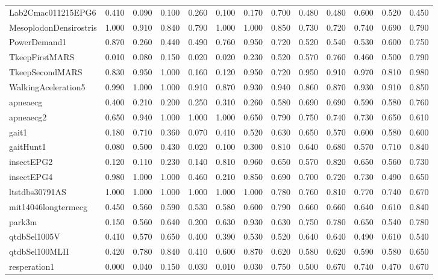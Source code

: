 \begin{tabular}{lrrrrrrrrrrrr}
Lab2Cmac011215EPG6 & 0.410 & 0.090 & 0.100 & 0.260 & 0.100 & 0.170 & 0.700 & 0.480 & 0.480 & 0.600 & 0.520 & 0.450 \\
MesoplodonDensirostris & 1.000 & 0.910 & 0.840 & 0.790 & 1.000 & 1.000 & 0.850 & 0.730 & 0.720 & 0.740 & 0.690 & 0.790 \\
PowerDemand1 & 0.870 & 0.260 & 0.440 & 0.490 & 0.760 & 0.950 & 0.720 & 0.520 & 0.540 & 0.530 & 0.600 & 0.750 \\
TkeepFirstMARS & 0.010 & 0.080 & 0.150 & 0.020 & 0.020 & 0.230 & 0.520 & 0.570 & 0.760 & 0.460 & 0.500 & 0.790 \\
TkeepSecondMARS & 0.830 & 0.950 & 1.000 & 0.160 & 0.120 & 0.950 & 0.720 & 0.950 & 0.910 & 0.970 & 0.810 & 0.980 \\
WalkingAceleration5 & 0.990 & 1.000 & 1.000 & 0.910 & 0.870 & 0.930 & 0.940 & 0.860 & 0.870 & 0.930 & 0.910 & 0.850 \\
apneaecg & 0.400 & 0.210 & 0.200 & 0.250 & 0.310 & 0.260 & 0.580 & 0.690 & 0.690 & 0.590 & 0.580 & 0.760 \\
apneaecg2 & 0.650 & 0.940 & 1.000 & 1.000 & 1.000 & 0.650 & 0.790 & 0.750 & 0.740 & 0.730 & 0.650 & 0.610 \\
gait1 & 0.180 & 0.710 & 0.360 & 0.070 & 0.410 & 0.520 & 0.630 & 0.650 & 0.570 & 0.600 & 0.580 & 0.600 \\
gaitHunt1 & 0.080 & 0.500 & 0.430 & 0.020 & 0.100 & 0.300 & 0.810 & 0.640 & 0.680 & 0.570 & 0.710 & 0.840 \\
insectEPG2 & 0.120 & 0.110 & 0.230 & 0.140 & 0.810 & 0.960 & 0.650 & 0.570 & 0.820 & 0.650 & 0.560 & 0.730 \\
insectEPG4 & 0.980 & 1.000 & 1.000 & 0.460 & 0.210 & 0.850 & 0.690 & 0.700 & 0.720 & 0.730 & 0.490 & 0.650 \\
ltstdbs30791AS & 1.000 & 1.000 & 1.000 & 1.000 & 1.000 & 1.000 & 0.780 & 0.760 & 0.810 & 0.770 & 0.740 & 0.670 \\
mit14046longtermecg & 0.450 & 0.560 & 0.590 & 0.530 & 0.580 & 0.600 & 0.790 & 0.660 & 0.660 & 0.640 & 0.610 & 0.840 \\
park3m & 0.150 & 0.560 & 0.640 & 0.200 & 0.630 & 0.930 & 0.630 & 0.750 & 0.780 & 0.650 & 0.540 & 0.780 \\
qtdbSel1005V & 0.410 & 0.570 & 0.650 & 0.400 & 0.390 & 0.530 & 0.520 & 0.640 & 0.640 & 0.490 & 0.610 & 0.540 \\
qtdbSel100MLII & 0.420 & 0.780 & 0.840 & 0.410 & 0.600 & 0.870 & 0.620 & 0.580 & 0.620 & 0.590 & 0.580 & 0.650 \\
resperation1 & 0.000 & 0.040 & 0.150 & 0.030 & 0.010 & 0.030 & 0.750 & 0.500 & 0.670 & 0.740 & 0.470 & 0.670 \\

\end{tabular}
